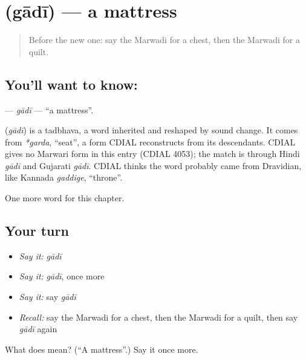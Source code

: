 \section[\texorpdfstring{\mw{गादी} (gādī)}{गादी (gādī)}]{ (gādī) — a mattress}

\label{lesson:MW-C122-gadi}



\begin{quote}
Before the new one: say the Marwadi for a chest, then the Marwadi for a quilt.
\end{quote}

\subsection*{You'll want to know: }
\textbf{} — \emph{gādī} — \textquotedblleft{}a mattress\textquotedblright{}.

\begin{cousinweb}
\textbf{} (\emph{gādī}) is a tadbhava, a word inherited and reshaped by sound change. It comes from \emph{*garda}, \textquotedblleft{}seat\textquotedblright{}, a form CDIAL reconstructs from its descendants. CDIAL gives no Marwari form in this entry (CDIAL 4053); the match is through Hindi \emph{gādī} and Gujarati \emph{gādī}. CDIAL thinks the word probably came from Dravidian, like Kannada \emph{gaddige}, \textquotedblleft{}throne\textquotedblright{}.
\end{cousinweb}

\begin{grammarlens}[title={What you've built}]
One more word for this chapter.
\end{grammarlens}

\subsection*{Your turn}
\begin{itemize}
\raggedright
  \item \emph{Say it:} \emph{gādī}
  \item \emph{Say it:} \emph{gādī}, once more
  \item \emph{Say it:} say \emph{gādī}
  \item \emph{Recall:} say the Marwadi for a chest, then the Marwadi for a quilt, then say \emph{gādī} again
\end{itemize}

\begin{tcolorbox}[breakable,colback=teal!4,colframe=teal!35!black,title={Before you move on}]
What does  mean? (\textquotedblleft{}A mattress\textquotedblright{}.) Say it once more.
\end{tcolorbox}

